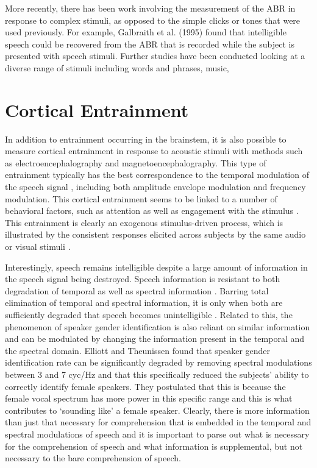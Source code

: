 \documentclass[titlepage]{article}
\begin{document}
    More recently, there has been work involving the measurement of the ABR in response to complex
    stimuli, as opposed to the simple clicks or tones that were used previously.
    For example, Galbraith et al. (1995) \cite{Galbraith1995} found that intelligible
    speech could be recovered from the ABR that is recorded while the subject is presented with
    speech stimuli. Further studies have been conducted looking at a diverse range of stimuli
    including words and phrases, music,

\section{Cortical Entrainment} \label{corticalEntrainment}

  In addition to entrainment occurring in the brainstem, it is also possible to measure cortical
  entrainment in response to acoustic stimuli with methods such as electroencephalography and
  magnetoencephalography. This type of entrainment typically has the best correspondence to the
  temporal modulation of the speech signal \cite{Ding2014a,Ding2014,Nourski2009,Horton2014},
  including both amplitude envelope modulation and frequency modulation. This cortical entrainment
  seems to be linked to a number of behavioral factors, such as attention
  \cite{Dmochowski2016,ZionGolumbic2013} as well as engagement with the stimulus \cite{Dmochowski2017}.
  This entrainment is clearly an exogenous stimulus-driven process, which is illustrated by the
  consistent responses elicited across subjects by the same audio or visual stimuli
  \cite{Cohen2017,Petroni2017}.

  Interestingly, speech remains intelligible despite a large amount of information in the speech
  signal being destroyed. Speech information is resistant to both degradation of temporal as well
  as spectral information \cite{Silipo1999,Drullman1994}. Barring total elimination of temporal
  and spectral information, it is only when both are sufficiently degraded that speech becomes
  unintelligible \cite{Elliott2009}. Related to this, the phenomenon of speaker gender identification
  is also reliant on similar information and can be modulated by changing the information present
  in the temporal and the spectral domain. Elliott and Theunissen \cite{Elliott2009} found that speaker
  gender identification rate can be significantly degraded by removing spectral modulations between 3 and
  7 cyc/Hz and that this specifically reduced the subjects' ability to correctly identify female speakers.
  They postulated that this is because the female vocal spectrum has more power in this specific range and
  this is what contributes to `sounding like' a female speaker. Clearly, there is more information than
  just that necessary for comprehension that is embedded in the temporal and spectral modulations of speech
  and it is important to parse out what is necessary for the comprehension of speech and what information
  is supplemental, but not necessary to the bare comprehension of speech.
\end{document}
